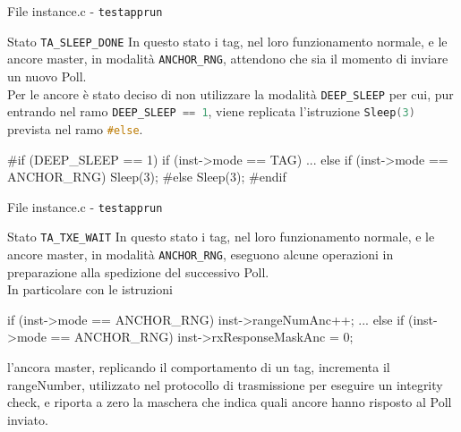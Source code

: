\begin{frame}[fragile, shrink=10]{File instance.c - \lstinline[language=C]!testapprun!}
  \begin{block}{Stato \lstinline[language=C]!TA_SLEEP_DONE!}
    In questo stato i tag, nel loro funzionamento normale, e le ancore master, in modalità
    \lstinline[language=C]!ANCHOR_RNG!, attendono che sia il momento di inviare un nuovo Poll.\\
    Per le ancore è stato deciso di non utilizzare la modalità \lstinline[language=C]!DEEP_SLEEP!
    per cui, pur entrando nel ramo \lstinline[language=C]!DEEP_SLEEP == 1!, viene replicata l'istruzione
    \lstinline[language=C]!Sleep(3)! prevista nel ramo \lstinline[language=C]!#else!.
    \begin{C}
      #if (DEEP_SLEEP == 1)
          if (inst->mode == TAG)
          {
            ...
          }  
          else if (inst->mode == ANCHOR_RNG)
              Sleep(3);
      #else
          Sleep(3);
      #endif
    \end{C}
  \end{block}
\end{frame}

\begin{frame}[fragile, shrink=10]{File instance.c - \lstinline[language=C]!testapprun!}
  \begin{block}{Stato \lstinline[language=C]!TA_TXE_WAIT!}
    In questo stato i tag, nel loro funzionamento normale, e le ancore master, in modalità
    \lstinline[language=C]!ANCHOR_RNG!, eseguono alcune operazioni in preparazione alla spedizione
    del successivo Poll.\\
    In particolare con le istruzioni
    \begin{C}
      if (inst->mode == ANCHOR_RNG)
          inst->rangeNumAnc++;
      ...
      else if (inst->mode == ANCHOR_RNG)
          inst->rxResponseMaskAnc = 0;
    \end{C}
    l'ancora master, replicando il comportamento di un tag, incrementa il rangeNumber,
    utilizzato nel protocollo di trasmissione per eseguire un integrity check, e riporta
    a zero la maschera che indica quali ancore hanno risposto al Poll inviato.
  \end{block}
\end{frame}

